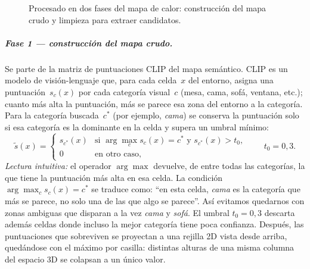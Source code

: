 \documentclass[11pt,fleqn,openany]{book} %
\begin{document}
\begin{figure}[H]
{%
}
\caption[Procesado en dos fases del mapa de calor.]{Procesado en dos fases del mapa de calor: construcción del mapa crudo y limpieza para extraer candidatos.}
\label{fig:heatmap_pipeline}
\end{figure}

\subparagraph{Fase 1 — construcción del mapa crudo.} Se parte de la matriz de puntuaciones CLIP del mapa semántico. CLIP es un modelo de visión-lenguaje que, para cada celda~$x$ del entorno, asigna una puntuación~$s_c(x)$ por cada categoría visual~$c$ (mesa, cama, sofá, ventana, etc.); cuanto más alta la puntuación, más se parece esa zona del entorno a la categoría. Para la categoría buscada~$c^{*}$ (por ejemplo, \emph{cama}) se conserva la puntuación solo si esa categoría es la dominante en la celda y supera un umbral mínimo:
%
\begin{equation}
\tilde s(x) =
\begin{cases}
s_{c^{*}}(x) & \text{si } \arg\max_{c} s_c(x) = c^{*} \text{ y } s_{c^{*}}(x) > t_0,\\
0 & \text{en otro caso,}
\end{cases}
\qquad t_0 = 0{,}3.
\label{eq:argmax_filter}
\end{equation}
%
\emph{Lectura intuitiva:} el operador $\arg\max$ devuelve, de entre todas las categorías, la que tiene la puntuación más alta en esa celda. La condición $\arg\max_c s_c(x) = c^{*}$ se traduce como: ``en esta celda, \emph{cama} es la categoría que más se parece, no solo una de las que algo se parece''. Así evitamos quedarnos con zonas ambiguas que disparan a la vez \emph{cama} y \emph{sofá}. El umbral $t_0=0{,}3$ descarta además celdas donde incluso la mejor categoría tiene poca confianza. Después, las puntuaciones que sobreviven se proyectan a una rejilla 2D vista desde arriba, quedándose con el máximo por casilla: distintas alturas de una misma columna del espacio 3D se colapsan a un único valor.
\end{document}
